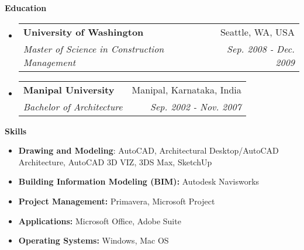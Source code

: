 \documentclass[letterpaper,10pt]{article}
\makeatletter
\newcommand{\resitem}[1]{\item #1}
\newcommand{\resheading}[1]{{\large \colorbox{mygrey}{\vspace{0.6in} \begin{minipage}{\textwidth}{\textbf{#1 \vphantom{p\^{E}}}}\end{minipage}}}}
\newcommand{\ressubheading}[4]{
  \begin{tabular*}{7in}{l@{\extracolsep{\fill}}r}
    \textbf{#1} & #2 \\
    \textit{#3} & \textit{#4} \\
\end{tabular*}}
\makeatother
\begin{document}

\resheading{Education}
\begin{itemize}
\item
  \ressubheading{University of Washington}{Seattle, WA, USA}{Master of Science in Construction Management}{Sep. 2008 - Dec. 2009}
\item
  \ressubheading{Manipal University}{Manipal, Karnataka, India}{Bachelor of Architecture}{Sep. 2002 - Nov. 2007}
\end{itemize}

\resheading{Skills}
\begin{itemize}
  \resitem{\textbf{Drawing and Modeling}: AutoCAD, Architectural Desktop/AutoCAD Architecture, AutoCAD 3D VIZ, 3DS Max, SketchUp}
  \resitem{\textbf{Building Information Modeling (BIM):} Autodesk Navisworks}
  \resitem{\textbf{Project Management:} Primavera, Microsoft Project}
  \resitem{\textbf{Applications:} Microsoft Office, Adobe Suite}
  \resitem{\textbf{Operating Systems:} Windows, Mac OS}
\end{itemize}
\end{document}
